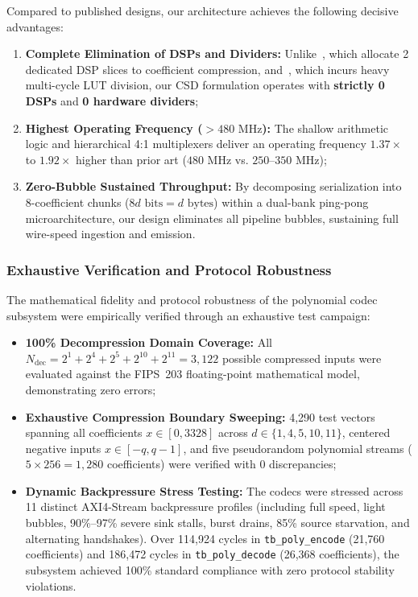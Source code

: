 Compared to published designs, our architecture achieves the following decisive advantages:
\begin{enumerate}
    \item \textbf{Complete Elimination of DSPs and Dividers:} Unlike~\cite{xing2023tcas1, imran2022tvlsi, bisz2024ches}, which allocate 2 dedicated DSP slices to coefficient compression, and~\cite{dang2024tifs}, which incurs heavy multi-cycle LUT division, our CSD formulation operates with \textbf{strictly 0 DSPs} and \textbf{0 hardware dividers};
    \item \textbf{Highest Operating Frequency ($> 480\text{ MHz}$):} The shallow arithmetic logic and hierarchical 4:1 multiplexers deliver an operating frequency $1.37\times$ to $1.92\times$ higher than prior art ($480\text{ MHz}$ vs. $250$--$350\text{ MHz}$);
    \item \textbf{Zero-Bubble Sustained Throughput:} By decomposing serialization into 8-coefficient chunks ($8d\text{ bits} = d\text{ bytes}$) within a dual-bank ping-pong microarchitecture, our design eliminates all pipeline bubbles, sustaining full wire-speed ingestion and emission.
\end{enumerate}

\subsubsection{Exhaustive Verification and Protocol Robustness}
The mathematical fidelity and protocol robustness of the polynomial codec subsystem were empirically verified through an exhaustive test campaign:
\begin{itemize}
    \item \textbf{100\% Decompression Domain Coverage:} All $N_{\text{dec}} = 2^1 + 2^4 + 2^5 + 2^{10} + 2^{11} = 3,122$ possible compressed inputs were evaluated against the FIPS~203 floating-point mathematical model, demonstrating zero errors;
    \item \textbf{Exhaustive Compression Boundary Sweeping:} 4,290 test vectors spanning all coefficients $x \in [0, 3328]$ across $d \in \{1, 4, 5, 10, 11\}$, centered negative inputs $x \in [-q, q-1]$, and five pseudorandom polynomial streams ($5 \times 256 = 1,280$ coefficients) were verified with 0 discrepancies;
    \item \textbf{Dynamic Backpressure Stress Testing:} The codecs were stressed across 11 distinct AXI4-Stream backpressure profiles (including full speed, light bubbles, 90\%--97\% severe sink stalls, burst drains, 85\% source starvation, and alternating handshakes). Over 114,924 cycles in \texttt{tb\_poly\_encode} (21,760 coefficients) and 186,472 cycles in \texttt{tb\_poly\_decode} (26,368 coefficients), the subsystem achieved 100\% standard compliance with zero protocol stability violations.
\end{itemize}
